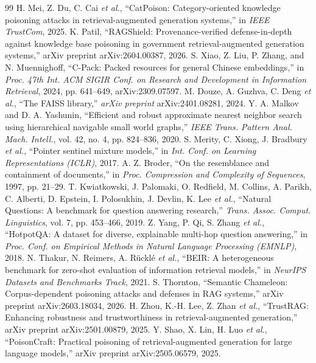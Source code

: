 \documentclass[10pt,journal,compsoc]{IEEEtran}
\begin{document}
\begin{thebibliography}{99}
 H. Mei, Z. Du, C. Cai \emph{et al.}, ``CatPoison: Category-oriented knowledge poisoning attacks in retrieval-augmented generation systems,'' in \emph{IEEE TrustCom}, 2025.
 K. Patil, ``RAGShield: Provenance-verified defense-in-depth against knowledge base poisoning in government retrieval-augmented generation systems,'' arXiv preprint arXiv:2604.00387, 2026.
 S. Xiao, Z. Liu, P. Zhang, and N. Muennighoff, ``C-Pack: Packed resources for general Chinese embeddings,'' in \emph{Proc. 47th Int. ACM SIGIR Conf. on Research and Development in Information Retrieval}, 2024, pp. 641--649, arXiv:2309.07597.
 M. Douze, A. Guzhva, C. Deng \emph{et al.}, ``The FAISS library,'' \emph{arXiv preprint} arXiv:2401.08281, 2024.
 Y. A. Malkov and D. A. Yashunin, ``Efficient and robust approximate nearest neighbor search using hierarchical navigable small world graphs,'' \emph{IEEE Trans. Pattern Anal. Mach. Intell.}, vol. 42, no. 4, pp. 824--836, 2020.
 S. Merity, C. Xiong, J. Bradbury \emph{et al.}, ``Pointer sentinel mixture models,'' in \emph{Int. Conf. on Learning Representations (ICLR)}, 2017.
 A. Z. Broder, ``On the resemblance and containment of documents,'' in \emph{Proc. Compression and Complexity of Sequences}, 1997, pp. 21--29.
 T. Kwiatkowski, J. Palomaki, O. Redfield, M. Collins, A. Parikh, C. Alberti, D. Epstein, I. Polosukhin, J. Devlin, K. Lee \emph{et al.}, ``Natural Questions: A benchmark for question answering research,'' \emph{Trans. Assoc. Comput. Linguistics}, vol. 7, pp. 453--466, 2019.
 Z. Yang, P. Qi, S. Zhang \emph{et al.}, ``HotpotQA: A dataset for diverse, explainable multi-hop question answering,'' in \emph{Proc. Conf. on Empirical Methods in Natural Language Processing (EMNLP)}, 2018.
 N. Thakur, N. Reimers, A. R\"{u}ckl\'{e} \emph{et al.}, ``BEIR: A heterogeneous benchmark for zero-shot evaluation of information retrieval models,'' in \emph{NeurIPS Datasets and Benchmarks Track}, 2021.
 S. Thornton, ``Semantic Chameleon: Corpus-dependent poisoning attacks and defenses in RAG systems,'' arXiv preprint arXiv:2603.18034, 2026.
 H. Zhou, K.-H. Lee, Z. Zhan \emph{et al.}, ``TrustRAG: Enhancing robustness and trustworthiness in retrieval-augmented generation,'' arXiv preprint arXiv:2501.00879, 2025.
 Y. Shao, X. Lin, H. Luo \emph{et al.}, ``PoisonCraft: Practical poisoning of retrieval-augmented generation for large language models,'' arXiv preprint arXiv:2505.06579, 2025.

\end{thebibliography}
\end{document}

